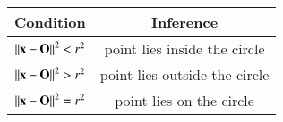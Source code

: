 
\begin{tabular}[]{|c|c|}
\hline
Condition	&Inference		\\\hline
$\left\lVert\mathbf{x}-\mathbf{O}\right\rVert^2<r^2$	&point lies inside the circle \\ \hline
$\left\lVert\mathbf{x}-\mathbf{O}\right\rVert^2>r^2$	&point lies outside the circle \\ \hline
$\left\lVert\mathbf{x}-\mathbf{O}\right\rVert^2=r^2$	&point lies on the circle \\ \hline	
\end{tabular}
